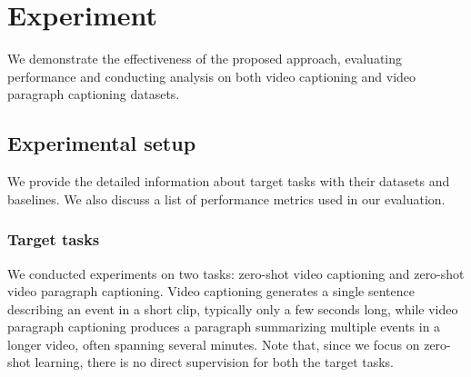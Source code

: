 


\section{Experiment}

We demonstrate the effectiveness of the proposed approach, evaluating performance and conducting analysis on both video captioning and video paragraph captioning datasets.

\label{sec:experiments}
\subsection{Experimental setup}
\label{sec:exp_setup}

We provide the detailed information about target tasks with their datasets and baselines.  
We also discuss a list of performance metrics used in our evaluation.

\subsubsection{Target tasks}
We conducted experiments on two tasks: zero-shot video captioning and zero-shot video paragraph captioning. 
Video captioning generates a single sentence describing an event in a short clip, typically only a few seconds long, while video paragraph captioning produces a paragraph summarizing multiple events in a longer video, often spanning several minutes.
Note that, since we focus on zero-shot learning, there is no direct supervision for both the target tasks.

